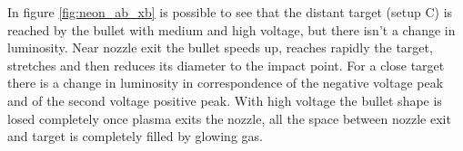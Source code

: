 In figure \ref{fig:neon_ab_xb} is possible to see that the distant target (setup C) is reached by the bullet with medium and high voltage, but there isn't a change in luminosity. Near nozzle exit the bullet speeds up, reaches rapidly the target, stretches and then reduces its diameter to the impact point.
For a close target there is a change in luminosity in correspondence of the negative voltage peak and of the second voltage positive peak. With high voltage the bullet shape is losed completely once plasma exits the nozzle, all the space between nozzle exit and target is completely filled by glowing gas.
\begin{figure}
 \centering
 \hfill
 
 \hfill
 

\end{figure}
